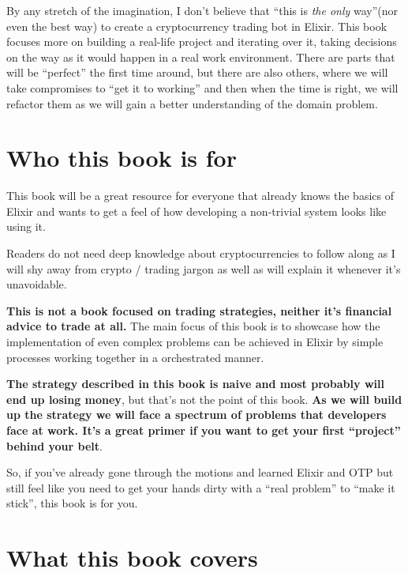 \documentclass[
]{book}
\begin{document}
By any stretch of the imagination, I don't believe that ``this is \emph{the only} way''(nor even the best way) to create a cryptocurrency trading bot in Elixir. This book focuses more on building a real-life project and iterating over it, taking decisions on the way as it would happen in a real work environment. There are parts that will be ``perfect'' the first time around, but there are also others, where we will take compromises to ``get it to working'' and then when the time is right, we will refactor them as we will gain a better understanding of the domain problem.

\hypertarget{who-this-book-is-for}{%
\section*{Who this book is for}\label{who-this-book-is-for}}

This book will be a great resource for everyone that already knows the basics of Elixir and wants to get a feel of how developing a non-trivial system looks like using it.

Readers do not need deep knowledge about cryptocurrencies to follow along as I will shy away from crypto / trading jargon as well as will explain it whenever it's unavoidable.

\textbf{This is not a book focused on trading strategies, neither it's financial advice to trade at all.} The main focus of this book is to showcase how the implementation of even complex problems can be achieved in Elixir by simple processes working together in a orchestrated manner.

\textbf{The strategy described in this book is naive and most probably will end up losing money}, but that's not the point of this book. \textbf{As we will build up the strategy we will face a spectrum of problems that developers face at work. It's a great primer if you want to get your first ``project'' behind your belt}.

So, if you've already gone through the motions and learned Elixir and OTP but still feel like you need to get your hands dirty with a ``real problem'' to ``make it stick'', this book is for you.

\hypertarget{what-this-book-covers}{%
\section*{What this book covers}\label{what-this-book-covers}}
\end{document}
